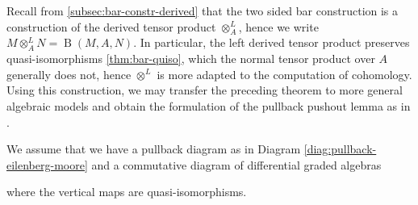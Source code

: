 \documentclass{scrartcl}
\theoremstyle{plain}
\theoremstyle{definition}
\newcommand{\APL}{A_{PL}}
\DeclareMathOperator{\BC}{B}
\begin{document}
Recall from \cref{subsec:bar-constr-derived} that the two sided bar construction is a construction of the derived tensor product $\otimes_A^L$, hence we write $M\otimes_A^L N = \BC(M, A, N)$. In particular, the left derived tensor product preserves quasi-isomorphisms \cref{thm:bar-quiso}, which the normal tensor product over $A$ generally does not, hence $\otimes^L$ is more adapted to the computation of cohomology. Using this construction, we may transfer the preceding theorem to more general algebraic models and obtain the formulation of the pullback pushout lemma as in \cite{naef2019string}.

We assume that we have a pullback diagram as in Diagram \ref{diag:pullback-eilenberg-moore} and a commutative diagram of differential graded algebras
\begin{center}
\end{center}
where the vertical maps are quasi-isomorphisms. 
\end{document}
